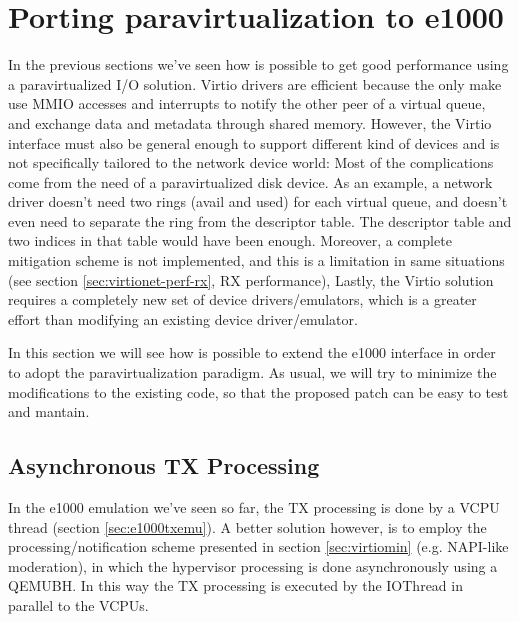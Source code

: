 \section{Porting paravirtualization to e1000}
\label{sec:e1000-paravirt}
In the previous sections we've seen how is possible to get good performance using a paravirtualized I/O solution. Virtio drivers are
efficient because the only make use MMIO accesses and interrupts to notify the other peer of a virtual queue, and exchange data and
metadata through shared memory.
However, the Virtio interface must also be general enough to support different kind of devices and is not specifically tailored to the
network device world: Most of the complications come from the need of a paravirtualized disk device. As an example, a network driver
doesn't need two rings (avail and used) for each virtual queue, and doesn't even need to separate the ring from the descriptor table. The
descriptor table and two indices in that table would have been enough.
Moreover, a complete mitigation scheme is not implemented, and this is a limitation in same situations (see section
\ref{sec:virtionet-perf-rx}, RX performance),
Lastly, the Virtio solution requires a completely new set of device drivers/emulators, which is a greater effort than modifying
an existing device driver/emulator.

\vspace{0.5cm}

In this section we will see how is possible to extend the e1000 interface in order to adopt the paravirtualization paradigm.
As usual, we will try to minimize the modifications to the existing code, so that the proposed patch can be easy to test and mantain.


\subsection{Asynchronous TX Processing}
\label{sec:e1000-par-async}
In the e1000 emulation we've seen so far, the TX processing is done by a VCPU thread (section \ref{sec:e1000txemu}).
A better solution however, is to employ the processing/notification scheme presented in section \ref{sec:virtiomin} (e.g. NAPI-like 
moderation), in which the hypervisor processing is done asynchronously using a QEMUBH.
In this way the TX processing is executed by the IOThread in parallel to the VCPUs.


